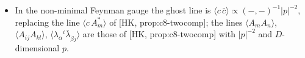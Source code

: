 \begin{remark}
\begin{itemize}
\item In the non-minimal Feynman gauge the ghost line is $\langle c\,\bar c\rangle\propto(-,-)^{-1}|p|^{-2}$, replacing the line $\langle c\,A^*_m\rangle$ of [HK, prop:c8-twocomp]; the lines $\langle A_mA_n\rangle$, $\langle A_{ij}A_{kl}\rangle$, $\langle\lambda_\alpha{}^i\bar\lambda_{\dot\beta j}\rangle$ are those of [HK, prop:c8-twocomp] with $|p|^{-2}$ and $D$-dimensional $p$.
\end{itemize}
\end{remark}

